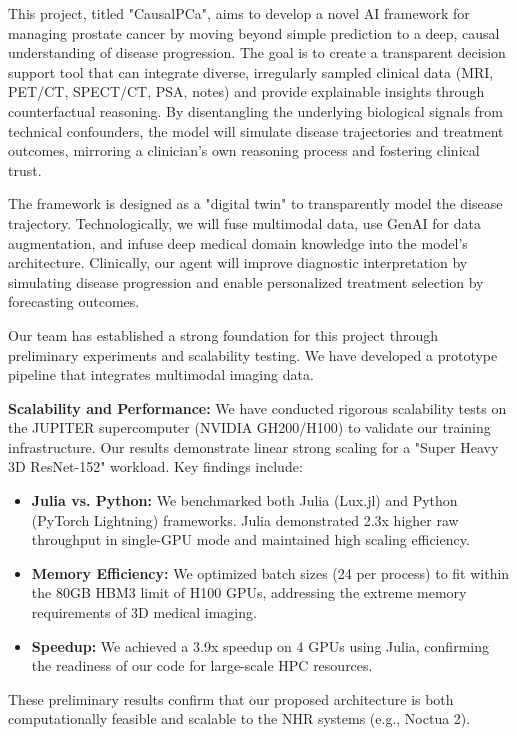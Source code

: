 \documentclass[new,showhints]{nhrproposal}
\begin{document}
\Titlepage

\Introduction
This project, titled "CausalPCa", aims to develop a novel AI framework for managing prostate cancer by moving beyond simple prediction to a deep, causal understanding of disease progression. The goal is to create a transparent decision support tool that can integrate diverse, irregularly sampled clinical data (MRI, PET/CT, SPECT/CT, PSA, notes) and provide explainable insights through counterfactual reasoning. By disentangling the underlying biological signals from technical confounders, the model will simulate disease trajectories and treatment outcomes, mirroring a clinician's own reasoning process and fostering clinical trust.

The framework is designed as a "digital twin" to transparently model the disease trajectory. Technologically, we will fuse multimodal data, use GenAI for data augmentation, and infuse deep medical domain knowledge into the model's architecture. Clinically, our agent will improve diagnostic interpretation by simulating disease progression and enable personalized treatment selection by forecasting outcomes.

\PreliminaryWork
Our team has established a strong foundation for this project through preliminary experiments and scalability testing. We have developed a prototype pipeline that integrates multimodal imaging data.

\textbf{Scalability and Performance:}
We have conducted rigorous scalability tests on the JUPITER supercomputer (NVIDIA GH200/H100) to validate our training infrastructure. Our results demonstrate linear strong scaling for a "Super Heavy 3D ResNet-152" workload. Key findings include:
\begin{itemize}
    \item \textbf{Julia vs. Python:} We benchmarked both Julia (Lux.jl) and Python (PyTorch Lightning) frameworks. Julia demonstrated 2.3x higher raw throughput in single-GPU mode and maintained high scaling efficiency.
    \item \textbf{Memory Efficiency:} We optimized batch sizes (24 per process) to fit within the 80GB HBM3 limit of H100 GPUs, addressing the extreme memory requirements of 3D medical imaging.
    \item \textbf{Speedup:} We achieved a 3.9x speedup on 4 GPUs using Julia, confirming the readiness of our code for large-scale HPC resources.
\end{itemize}

These preliminary results confirm that our proposed architecture is both computationally feasible and scalable to the NHR systems (e.g., Noctua 2).
\end{document}

